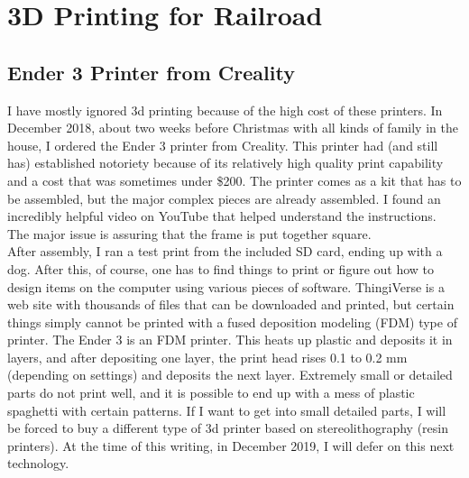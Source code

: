 %



\chapter{3D Printing for Railroad}
\minitoc

\section{Ender 3 Printer from Creality}

I have mostly ignored 3d printing because of the high cost of these printers.  In December 2018, about two weeks before Christmas with all kinds of family in the house,
I ordered the Ender 3 printer from Creality.  This printer had (and still has) established notoriety because of its relatively high quality print
capability and a cost that was sometimes under \$200.  The printer comes as a kit that has to be assembled, but the major complex pieces are already
assembled.  I found an incredibly helpful video on YouTube that helped understand the instructions.  The major issue is assuring that the frame is put together square.\\

After assembly, I ran a test print from the included SD card, ending up with a dog.  After this, of course, one has to find things to print or figure out how to design
items on the computer using various pieces of software.  ThingiVerse is a web site with thousands of files that can be downloaded and printed, but certain things
simply cannot be printed with a fused deposition modeling (FDM) type of printer.  The Ender 3 is an FDM printer.  This heats up plastic and deposits it in layers, and after depositing one layer, the print head rises 0.1 to 0.2 mm (depending on settings) and deposits the next layer.  Extremely small or detailed parts do not print well,
and it is possible to end up with a mess of plastic spaghetti with certain patterns.  If I want to get into small detailed parts, I will be forced to buy a different type of 3d printer based on stereolithography (resin printers).  At the time of this writing, in December 2019, I will defer on this next technology.

